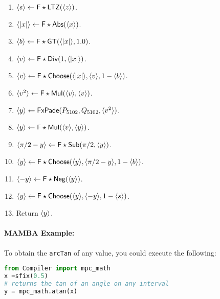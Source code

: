 \begin{enumerate}
\item $\langle s \rangle \leftarrow \mathsf{F\star LTZ}(\langle z \rangle)$.
\item $\langle |x| \rangle \leftarrow \mathsf{F\star Abs}(\langle x \rangle)$.
\item $\langle b \rangle \leftarrow \mathsf{F\star GT}(\langle |x| \rangle,1.0)$.
\item $\langle v \rangle \leftarrow \mathsf{F\star Div}(1,\langle |x| \rangle)$.
\item $\langle v \rangle \leftarrow \mathsf{F\star Choose}(\langle |x| \rangle,\langle v \rangle,1-\langle b \rangle)$.
\item $\langle v^2 \rangle \leftarrow \mathsf{F\star Mul}(\langle v \rangle,\langle v \rangle)$.
\item $\langle y \rangle \leftarrow \mathsf{FxPade}(P_{5102},Q_{5102},\langle v^2 \rangle)$.
\item $\langle y \rangle \leftarrow \mathsf{F\star Mul}(\langle v \rangle,\langle y \rangle)$.
\item $\langle \pi/2-y \rangle \leftarrow \mathsf{F\star Sub}(\pi/2,\langle y \rangle)$.
\item $\langle y \rangle \leftarrow \mathsf{F\star Choose}(\langle y \rangle,\langle \pi/2-y \rangle,1-\langle b \rangle)$.
\item $\langle -y \rangle \leftarrow \mathsf{F\star Neg}(\langle y \rangle)$.
\item $\langle y \rangle \leftarrow \mathsf{F\star Choose}(\langle y \rangle,\langle -y \rangle,1-\langle s \rangle)$.
\item Return $\langle y \rangle$.
\end{enumerate}

\paragraph{MAMBA Example:} To obtain the \verb|arcTan| of any value, you could execute the following:
\begin{lstlisting}[language={python}]
from Compiler import mpc_math
x =sfix(0.5)
# returns the tan of an angle on any interval
y = mpc_math.atan(x)
\end{lstlisting}
